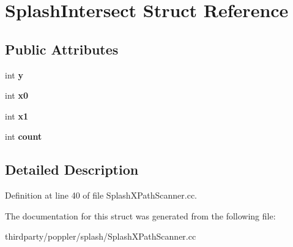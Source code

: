 \hypertarget{struct_splash_intersect}{}\section{Splash\+Intersect Struct Reference}
\label{struct_splash_intersect}
\subsection*{Public Attributes}
\begin{DoxyCompactItemize}
\item 
\mbox{\label{struct_splash_intersect_a664b4a1d5e15d82b40f8ed82962fddfa}} 
int {\bfseries y}
\item 
\mbox{\label{struct_splash_intersect_a0bc00931596bd5301fe1cef8e42bc1b1}} 
int {\bfseries x0}
\item 
\mbox{\label{struct_splash_intersect_a06a024a12093feea969cf52ce7e777fd}} 
int {\bfseries x1}
\item 
\mbox{\label{struct_splash_intersect_a9fce6a587e74cfbb1149a8177553af93}} 
int {\bfseries count}
\end{DoxyCompactItemize}


\subsection{Detailed Description}


Definition at line 40 of file Splash\+X\+Path\+Scanner.\+cc.



The documentation for this struct was generated from the following file\+:\begin{DoxyCompactItemize}
\item 
thirdparty/poppler/splash/Splash\+X\+Path\+Scanner.\+cc\end{DoxyCompactItemize}
